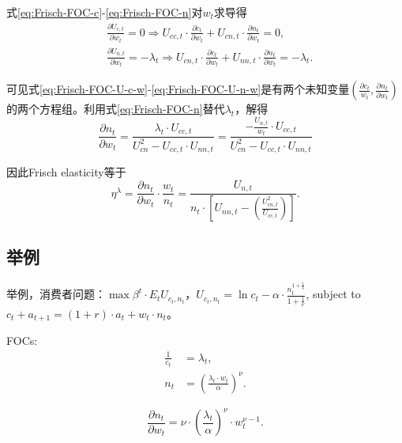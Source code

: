 式\eqref{eq:Frisch-FOC-c}-\eqref{eq:Frisch-FOC-n}对$w_t$求导得
\begin{align}
\label{eq:Frisch-FOC-U-c-w}
  &\frac{\partial U_{c,t}}{\partial w_t} = 0 \Rightarrow U_{cc,t} \cdot \frac{\partial c_t}{\partial w_t} + U_{cn,t} \cdot \frac{\partial n_t}{\partial w_t} = 0,\\
\label{eq:Frisch-FOC-U-n-w}
  &\frac{\partial U_{n,t}}{\partial w_t} = -\lambda_t \Rightarrow U_{cn,t} \cdot \frac{\partial c_t}{\partial w_t} + U_{nn,t} \cdot \frac{\partial n_t}{\partial w_t} = -\lambda_t.
\end{align}

可见式\eqref{eq:Frisch-FOC-U-c-w}-\eqref{eq:Frisch-FOC-U-n-w}是有两个未知变量$\left(\frac{\partial c_t}{w_t},\frac{\partial n_t}{\partial w_t}\right)$的两个方程组。利用式\eqref{eq:Frisch-FOC-n}替代$\lambda_t$，解得
\begin{equation}
  \label{eq:Frisch-ela}
  \frac{\partial n_t}{\partial w_t} = \frac{\lambda_t \cdot U_{cc,t}}{U_{cn}^2 - U_{cc,t} \cdot U_{nn,t}} = \frac{- \frac{U_{n,t}}{w_t} \cdot U_{cc,t}}{U_{cn}^2 - U_{cc,t} \cdot U_{nn,t}}
\end{equation}

因此Frisch elasticity等于
\begin{equation}
  \label{eq:Frisch-ela-consumption-example}
  \eta^{\lambda} = \frac{\partial n_t}{\partial w_t} \cdot \frac{w_t}{n_t} = \frac{U_{n,t}}{n_t \cdot \left[U_{nn,t}-\left(\frac{U_{cn,t}^2}{U_{cc,t}}\right)\right]}.
\end{equation}

\subsection{举例}
举例，消费者问题：$\max \beta^t \cdot E_t U_{c_t,n_t}$，$U_{c_t,n_t} = \ln c_t - \alpha \cdot \frac{n_t^{1+\frac{1}{\nu}}}{1+\frac{1}{\nu}}$, subject to $c_t + a_{t+1} = (1+r) \cdot a_t + w_t \cdot n_t$。

FOCs:
\begin{align}
\label{Frisch-example-FOC-c}
\frac{1}{c_t} &= \lambda_t,\\
\label{Frisch-example-FOC-n}
n_t &= \left(\frac{\lambda_t \cdot w_t}{\alpha}\right)^{\nu}.
\end{align}

\begin{equation}
  \label{eq:Frisch-example-partial-n-w}
  \frac{\partial n_t}{\partial w_t} = \nu \cdot \left(\frac{\lambda_t}{\alpha}\right)^{\nu} \cdot w_t^{\nu -1}.
\end{equation}


